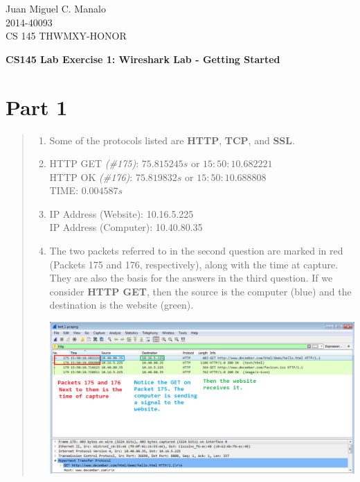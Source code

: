 \documentclass[11pt]{article}
\begin{document}
\begin{flushleft}
Juan Miguel C. Manalo \\
2014-40093 \\
CS 145 THWMXY-HONOR
\end{flushleft}

\begin{center}
\textbf{CS145 Lab Exercise 1: Wireshark Lab - Getting Started} 
\end{center}

\section*{Part 1}
\begin{quote}
\begin{enumerate}
\item{Some of the protocols listed are \textbf{HTTP}, \textbf{TCP}, and \textbf{SSL}.}
\item
HTTP GET \textit{(\#175)}: $75.815245s$ or $15:50:10.682221$ \\
HTTP OK \textit{(\#176)}: $75.819832s$ or $15:50:10.688808$ \\
TIME: $0.004587s$
\item
IP Address (Website): 10.16.5.225 \\
IP Address (Computer): 10.40.80.35
\item
The two packets referred to in the second question are marked in red (Packets 175 and 176, respectively), along with the time at capture. They are also the basis for the answers in the third question. If we consider \textbf{HTTP GET}, then the source is the computer (blue) and the destination is the website (green).
\begin{center}
\includegraphics[scale=0.5]{LEPic_1D}
\end{center}

\end{enumerate}
\end{quote}
\end{document}
